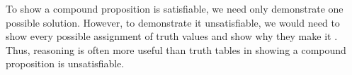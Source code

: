 To show a compound proposition is satisfiable, we need only demonstrate one possible solution.
However, to demonstrate it unsatisfiable, we would need to show every possible assignment of truth values and show why they make it \lfalse{}.
Thus, reasoning is often more useful than truth tables in showing a compound proposition is unsatisfiable.


